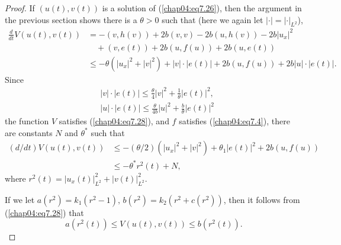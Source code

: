 \documentclass{surv-l}
\theoremstyle{plain}
\theoremstyle{definition}
\numberwithin{equation}{section}
\numberwithin{figure}{chapter}
\begin{document}
\begin{proof}
If $(u(t), v(t))$ is a solution of (\ref{chap04:eq7.26}), then the argument in the previous section shows there is a $\theta>0$ such that (here we again let $| \cdot |=|\cdot|_{L^{2}}$),
\begin{align*}
\frac{d}{dt}V(u(t), v(t))&=-(v, h(v))+2b(v, v)-2b(u, h(v))-2b|u_{x}|^{2}\\
&\quad+(v, e(t))+2b(u, f(u))+2b(u, e(t))\\
&\leq-\theta(|u_{x}|^{2}+|v|^{2})+|v|\cdot|e(t)|+2b(u, f(u))+2b|u|\cdot|e(t)|.
\end{align*}
Since
\begin{align*}
&|v|\cdot|e(t)|\leq\frac{\theta}{4}|v|^{2}+\frac{1}{\theta}|e(t)|^{2},\\
&|u|\cdot|e(t)|\leq\frac{\theta}{4b}|u|^{2}+\frac{b}{\theta}|e(t)|^{2}
\end{align*}
the function $V$ satisfies (\ref{chap04:eq7.28}), and $f$ satisfies (\ref{chap04:eq7.4}), there are constants $N$ and $\theta^{\ast}$ such that
\begin{equation}\label{chap04:eq7.29}
\begin{split}
(d/dt)V(u(t), v(t))&\leq-(\theta/2)(|u_{x}|^{2}+|v|^{2})+\theta_{1}|e(t)|^{2}+2b(u, f(u))\\
&\leq-\theta^{\ast}r^{2}(t)+N,
\end{split}
\end{equation}
where $r^{2}(t)=|u_{x}(t)|_{L^{2}}^{2}+|v(t)|_{L^{2}}^{2}$.

If we let $a(r^{2})=k_{1}(r^{2}-1),\, b(r^{2})=k_{2}(r^{2}+c(r^{2}))$, then it follows from (\ref{chap04:eq7.28}) that
\begin{equation}\label{chap04:eq7.30}
a(r^{2}(t))\leq V(u(t), v(t))\leq b(r^{2}(t)).
\end{equation}


\end{proof}
\end{document}
